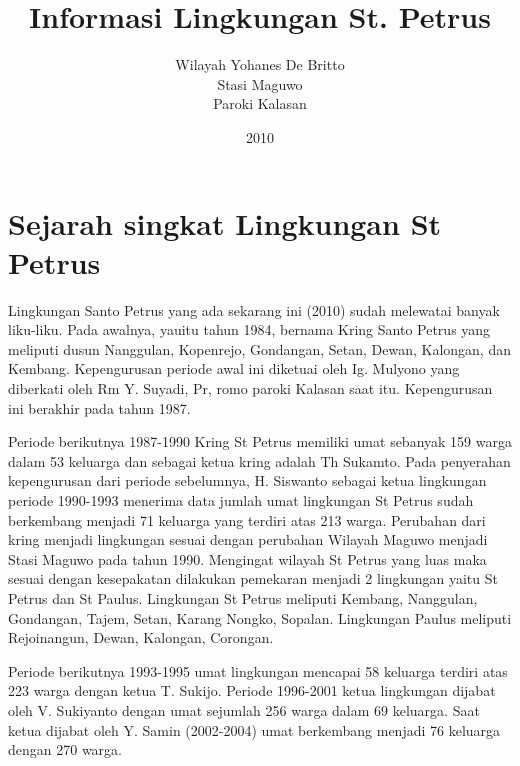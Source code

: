 \documentclass[a5paper,headsepline,titlepage,11pt,nnormalheadings,DIVcalc]{book}
\title{Informasi Lingkungan St. Petrus}
\author{Wilayah Yohanes De Britto \\Stasi Maguwo \\Paroki Kalasan}
\date{2010}
\begin{document}
\thispagestyle{empty}

\setlength{\parskip}{2mm}
\section*{Sejarah singkat Lingkungan St Petrus}
Lingkungan Santo Petrus yang ada sekarang ini (2010) sudah melewatai banyak liku-liku. Pada awalnya, yauitu tahun 1984, bernama Kring Santo Petrus yang meliputi dusun Nanggulan, Kopenrejo, Gondangan, Setan, Dewan, Kalongan,  dan Kembang. Kepengurusan periode awal ini diketuai oleh Ig. Mulyono yang diberkati oleh Rm Y. Suyadi, Pr, romo paroki Kalasan saat itu. Kepengurusan ini berakhir pada tahun 1987.

Periode berikutnya 1987-1990 Kring St Petrus memiliki umat sebanyak 159 warga dalam 53 keluarga dan sebagai ketua kring adalah Th Sukamto. 
Pada penyerahan kepengurusan dari periode sebelumnya, H. Siswanto sebagai ketua lingkungan periode 1990-1993 menerima data jumlah umat lingkungan St Petrus sudah berkembang menjadi 71 keluarga yang terdiri atas 213 warga. Perubahan dari kring menjadi lingkungan sesuai dengan perubahan Wilayah Maguwo menjadi Stasi Maguwo pada tahun 1990. 
Mengingat wilayah St Petrus yang luas maka sesuai dengan kesepakatan dilakukan pemekaran menjadi 2 lingkungan yaitu St Petrus dan St Paulus. Lingkungan St Petrus meliputi Kembang, Nanggulan, Gondangan, Tajem, Setan, Karang Nongko, Sopalan. Lingkungan Paulus meliputi Rejoinangun, Dewan, Kalongan, Corongan.

Periode berikutnya 1993-1995 umat lingkungan mencapai 58 keluarga terdiri atas 223 warga dengan ketua T. Sukijo. Periode 1996-2001 ketua lingkungan dijabat oleh V. Sukiyanto dengan umat sejumlah 256 warga dalam 69 keluarga. Saat ketua dijabat oleh Y. Samin (2002-2004) umat berkembang menjadi 76 keluarga dengan 270 warga.
\end{document}
